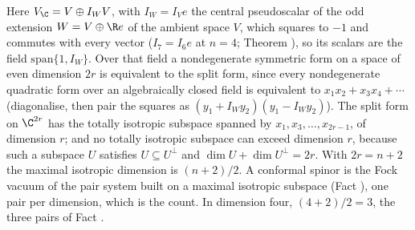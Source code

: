 Here $V_{\C} = V \oplus I_{W}V$, with $I_{W} = I_{V}e$ the central pseudoscalar of the odd extension $W = V \oplus \R e$ of the ambient space $V$, which squares to $-1$ and commutes with every vector ($I_{7} = I_{6}e$ at $n = 4$; Theorem ), so its scalars are the field $\mathrm{span}\{1, I_{W}\}$. Over that field a nondegenerate symmetric form on a space of even dimension $2r$ is equivalent to the split form, since every nondegenerate quadratic form over an algebraically closed field is equivalent to $x_{1}x_{2} + x_{3}x_{4} + \cdots$ (diagonalise, then pair the squares as $(y_{1} + I_{W}y_{2})(y_{1} - I_{W}y_{2})$). The split form on $\C^{2r}$ has the totally isotropic subspace spanned by $x_{1}, x_{3}, \ldots, x_{2r-1}$, of dimension $r$; and no totally isotropic subspace can exceed dimension $r$, because such a subspace $U$ satisfies $U \subseteq U^{\perp}$ and $\dim U + \dim U^{\perp} = 2r$. With $2r = n + 2$ the maximal isotropic dimension is $(n+2)/2$. A conformal spinor is the Fock vacuum of the pair system built on a maximal isotropic subspace (Fact ), one pair per dimension, which is the count. In dimension four, $(4+2)/2 = 3$, the three pairs of Fact .
